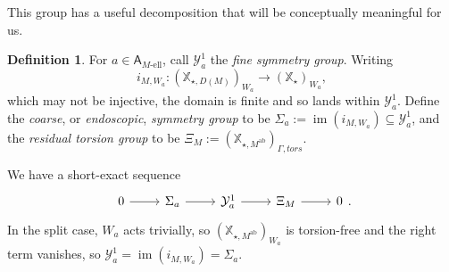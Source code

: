 \documentclass[openany]{amsbook}
\theoremstyle{definition}
\newtheorem{definition}[theorem]{Definition}
\theoremstyle{remark}
\numberwithin{equation}{section}
\newcommand{\cY}{\mathcal{Y}}
\newcommand{\im}{\operatorname{im}}
\renewcommand{\-}{\operatorname{-}}
\newcommand{\el}{\text{-ell}}
\newcommand{\bA}{\mathsf{A}}
\newcommand{\bX}{\mathbb{X}}
\newcommand{\bAe}[1]{\bA_{#1\el}}
\newcommand{\tors}{\mathit{tors}}
\newcommand{\ab}{\mathrm{ab}}
\begin{document}
This group has a useful decomposition that will be conceptually meaningful for us. 
\begin{definition}\label{def.end.symmetry.and.residual.torsion}
    For $a \in \bAe{M}$, call $\cY^1_a$ the \emph{fine symmetry group}. Writing
    $$
        i_{M, W_a} : (\bX_{\star, D(M)})_{W_a} \longrightarrow (\bX_{\star})_{W_a},
    $$
    which may not be injective, the domain is finite and so lands within $\cY^1_a$. Define the \emph{coarse}, or \emph{endoscopic}, \emph{symmetry group} to be $\Sigma_a := \im(i_{M, W_a}) \subseteq \cY^1_a$, and the \emph{residual torsion group} to be $\Xi_M := (\bX_{\star, M^{\ab}})_{\Gamma, \tors}$. 
\end{definition}

We have a short-exact sequence
\begin{equation}\label{eqn.Y1.fiber.descr}
    \begin{tikzcd}[ampersand replacement=\&]
        0 \ar[r] \& \Sigma_a \ar[r] \& \cY^1_a \ar[r] \& \Xi_M \ar[r] \& 0
    \end{tikzcd}.
\end{equation}
In the split case, $W_a$ acts trivially, so $(\bX_{\star, M^{\ab}})_{W_a}$ is torsion-free and the right term vanishes, so $\cY^1_a = \im(i_{M, W_a})= \Sigma_a$.
\end{document}
